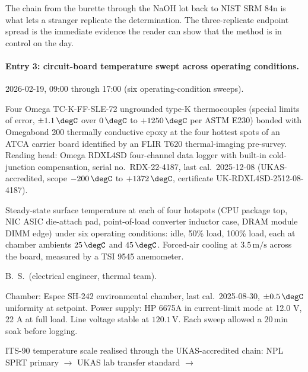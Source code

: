 The chain from the burette through the NaOH lot back to NIST SRM 84n
is what lets a stranger replicate the determination. The
three-replicate endpoint spread is the immediate evidence the reader
can show that the method is in control on the day.

\paragraph{Entry 3: circuit-board temperature swept across operating
conditions.}

\begin{description}[leftmargin=2em, itemsep=2pt]
  \item[Date / time.] 2026-02-19, 09{:}00 through 17{:}00 (six
    operating-condition sweeps).
  \item[Instrument.] Four Omega TC-K-FF-SLE-72 ungrounded type-K
    thermocouples \cite{web:ch01t3-omega-tck} (special limits of
    error, $\pm 1.1 \,\degC$ over $0 \,\degC$ to $+1250 \,\degC$
    per ASTM E230) bonded with Omegabond 200 thermally conductive
    epoxy at the four hottest spots of an ATCA carrier board
    identified by an FLIR T620 thermal-imaging pre-survey. Reading
    head: Omega RDXL4SD four-channel data logger with built-in
    cold-junction compensation, serial no.\ RDX-22-4187,
    last cal.\ 2025-12-08 (UKAS-accredited, scope $-200 \,\degC$ to
    $+1372 \,\degC$, certificate UK-RDXL4SD-2512-08-4187).
  \item[Measurand and setup.] Steady-state surface temperature at
    each of four hotspots (CPU package top, NIC ASIC die-attach
    pad, point-of-load converter inductor case, DRAM module DIMM
    edge) under six operating conditions: idle, 50\% load, 100\%
    load, each at chamber ambients $25 \,\degC$ and $45 \,\degC$.
    Forced-air cooling at $3.5 \,\si{\meter\per\second}$ across
    the board, measured by a TSI 9545 anemometer.
  \item[Operator.] B.~S.\ (electrical engineer, thermal team).
  \item[Conditions.] Chamber: Espec SH-242 environmental chamber,
    last cal.\ 2025-08-30, $\pm 0.5 \,\degC$ uniformity at setpoint.
    Power supply: HP 6675A in current-limit mode at 12.0 V, 22 A
    at full load. Line voltage stable at $120.1 \,\si{\volt}$. Each
    sweep allowed a $20 \,\si{\minute}$ soak before logging.
  \item[Provenance of reference.] ITS-90 temperature scale
    \cite{web:bipm-cct-its90} realised through the UKAS-accredited
    chain: NPL SPRT primary $\to$ UKAS lab transfer standard $\to$

\end{description}
